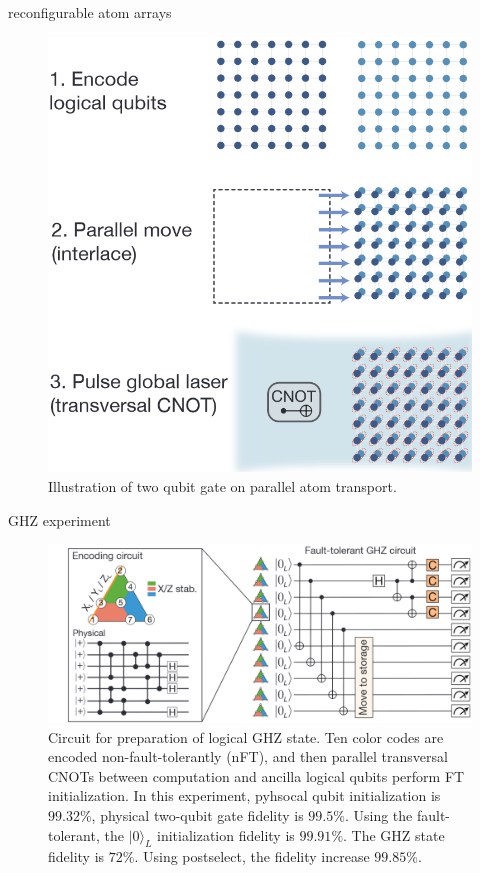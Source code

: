 \documentclass[18 pt]{beamer}
\begin{document}
\begin{frame}{reconfigurable atom arrays}
  \begin{figure}
    \includegraphics[width=.5\textwidth]{IMG/reconfigure.png}
    \caption{Illustration of two qubit gate on parallel atom transport.}
  \end{figure}
\end{frame}
\begin{frame}{GHZ experiment}
\begin{figure}
  \includegraphics[width=.8\textwidth]{IMG/ghz.png}
  \caption{Circuit for preparation of logical GHZ state. Ten color codes are encoded non-fault-tolerantly (nFT), and then parallel transversal CNOTs between computation and ancilla logical qubits perform FT initialization. In this experiment, pyhsocal qubit initialization is $99.32\%$, physical two-qubit gate fidelity is $99.5\%$. Using the fault-tolerant, the $|0\rangle_{L}$ initialization fidelity is $99.91\%$. The GHZ state fidelity is $72\%$. Using postselect, the fidelity increase $99.85\%$.}
\end{figure}
\end{frame}
\end{document}
